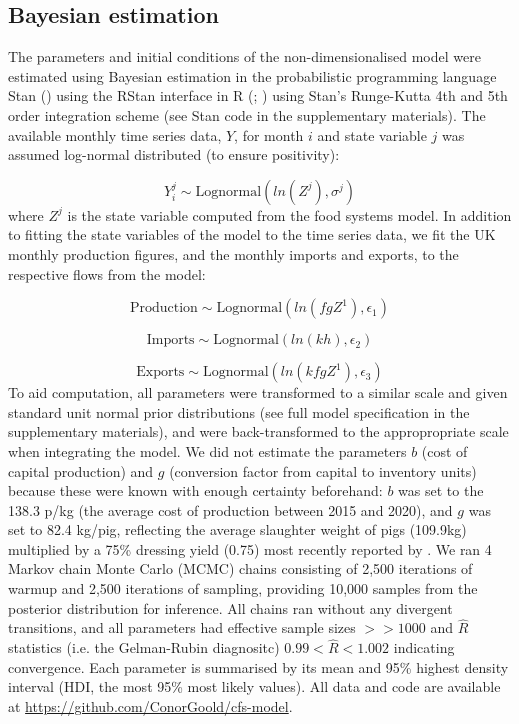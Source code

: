 \documentclass[12pt]{article}
\begin{document}
\subsection{Bayesian estimation}
The parameters and initial conditions of the non-dimensionalised model were estimated using Bayesian estimation in the probabilistic programming language Stan (\cite{carpenter2017}) using the RStan interface in R (\cite{stan2019}; \cite{rcoreteam2020}) using Stan's Runge-Kutta 4th and 5th order integration scheme (see Stan code in the supplementary materials). The available monthly time series data, $Y$, for month $i$ and state variable $j$ was assumed log-normal distributed (to ensure positivity):

\begin{equation}
  Y_{i}^{j} \sim \text{Lognormal}( ln( Z^{j} ), \sigma^{j})
\end{equation}
%
where $Z^{j}$ is the state variable computed from the food systems model. In addition to fitting the state variables of the model to the time series data, we fit the UK monthly production figures, and the monthly imports and exports, to the respective flows from the model:

\begin{equation}
  \text{Production} \sim \text{Lognormal}( ln( f g Z^{1} ), \epsilon_{1})
\end{equation}

\begin{equation}
  \text{Imports} \sim \text{Lognormal}( ln( k h ), \epsilon_{2})
\end{equation}

\begin{equation}
  \text{Exports} \sim \text{Lognormal}( ln( k f g Z^{1} ), \epsilon_{3})
\end{equation}
%
To aid computation, all parameters were transformed to a similar scale and given standard unit normal prior distributions (see full model specification in the supplementary materials), and were back-transformed to the appropropriate scale when integrating the model. We did not estimate the parameters $b$ (cost of capital production) and $g$ (conversion factor from capital to inventory units) because these were known with enough certainty beforehand: $b$ was set to the 138.3 p/kg (the average cost of production between 2015 and 2020), and $g$ was set to 82.4 kg/pig, reflecting the average slaughter weight of pigs (109.9kg) multiplied by a 75\% dressing yield (0.75) most recently reported by \textcite{AHDBpocketbook2018}. We ran 4 Markov chain Monte Carlo (MCMC) chains consisting of 2,500 iterations of warmup and 2,500 iterations of sampling, providing 10,000 samples from the posterior distribution for inference. All chains ran without any divergent transitions, and all parameters had effective sample sizes $>> 1000$ and $\hat{R}$ statistics (i.e. the Gelman-Rubin diagnositc) $0.99 < \hat{R} < 1.002$ indicating convergence. Each parameter is summarised by its mean and 95\% highest density interval (HDI, the most 95\% most likely values). All data and code are available at \href{https://github.com/ConorGoold/cfs-model}{https://github.com/ConorGoold/cfs-model}.
\end{document}
